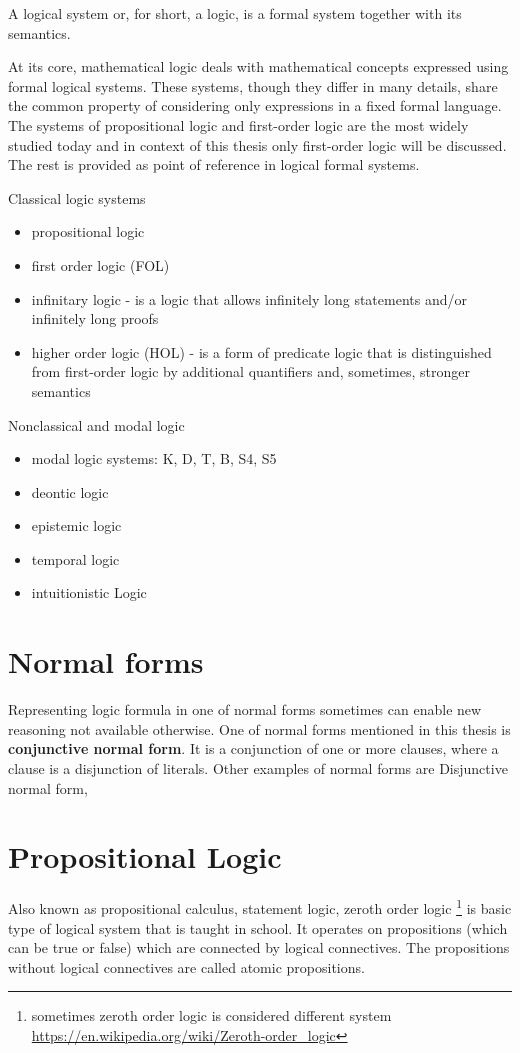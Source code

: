 A logical system or, for short, a logic, is a formal system together with its semantics.

At its core, mathematical logic deals with mathematical concepts expressed using formal logical systems. These systems, though they differ in many details, share the common property of considering only expressions in a fixed formal language. The systems of propositional logic and first-order logic are the most widely studied today and in context of this thesis only first-order logic will be discussed. The rest is provided as point of reference in logical formal systems.

Classical logic systems

\begin{itemize}
  \item propositional logic 
  \item first order logic (FOL)
  \item infinitary logic - is a logic that allows infinitely long statements and/or infinitely long proofs
  \item higher order logic (HOL) - is a form of predicate logic that is distinguished from first-order logic by additional quantifiers and, sometimes, stronger semantics
\end{itemize}

Nonclassical and modal logic
\begin{itemize}
  \item modal logic systems: K, D, T, B, S4, S5
  \item deontic logic 
  \item epistemic logic
  \item temporal logic
  \item intuitionistic Logic 
\end{itemize}

\section{Normal forms}

Representing logic formula in one of normal forms sometimes can enable new reasoning not available otherwise. One of normal forms mentioned in this thesis is \textbf{conjunctive normal form}. It is a conjunction of one or more clauses, where a clause is a disjunction of literals. Other examples of normal forms are Disjunctive normal form, 

\section{Propositional Logic}
Also known as propositional calculus, statement logic, zeroth order logic \footnote{sometimes zeroth order logic is considered different system \url{https://en.wikipedia.org/wiki/Zeroth-order_logic}} is basic type of logical system that is taught in school. It operates on propositions (which can be true or false) which are connected by logical connectives. The propositions without logical connectives are called atomic propositions.

